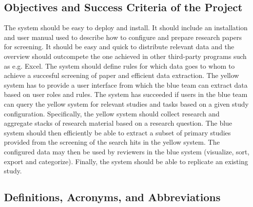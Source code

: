 \subsection{Objectives and Success Criteria of the Project}
The system should be easy to deploy and install. It should include an installation and user manual used to describe how to configure and prepare research papers for screening. It should be easy and quick to distribute relevant data and the overview should outcompete the one achieved in other third-party programs such as e.g. Excel. The system should define rules for which data goes to whom to achieve a succesful screening of paper and efficient data extraction. The yellow system has to provide a user interface from which the blue team can extract data based on user roles and rules. The system has succeeded if users in the blue team can query the yellow system for relevant studies and tasks based on a given study configuration. Specifically, the yellow system should collect research and aggregate stacks of research material based on a research question. The blue system should then efficiently be able to extract a subset of primary studies provided from the screening of the search hits in the yellow system. The configured data may then be used by reviewers in the blue system (visualize, sort, export and categorize). Finally, the system should be able to replicate an existing study.

\newpage

\subsection{Definitions, Acronyms, and Abbreviations}


